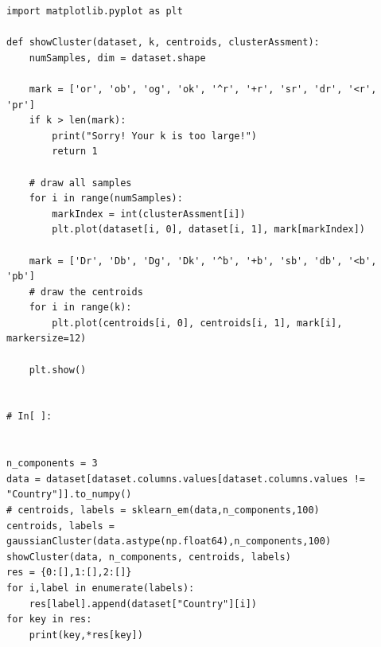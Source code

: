 ﻿\documentclass[a4paper, 11pt]{article}
\numberwithin{equation}{subsection}
\begin{document}
\begin{lstlisting}
import matplotlib.pyplot as plt

def showCluster(dataset, k, centroids, clusterAssment):
    numSamples, dim = dataset.shape

    mark = ['or', 'ob', 'og', 'ok', '^r', '+r', 'sr', 'dr', '<r', 'pr']
    if k > len(mark):
        print("Sorry! Your k is too large!")
        return 1

    # draw all samples
    for i in range(numSamples):
        markIndex = int(clusterAssment[i])
        plt.plot(dataset[i, 0], dataset[i, 1], mark[markIndex])

    mark = ['Dr', 'Db', 'Dg', 'Dk', '^b', '+b', 'sb', 'db', '<b', 'pb']
    # draw the centroids
    for i in range(k):
        plt.plot(centroids[i, 0], centroids[i, 1], mark[i], markersize=12)

    plt.show()


# In[ ]:


n_components = 3
data = dataset[dataset.columns.values[dataset.columns.values != "Country"]].to_numpy()
# centroids, labels = sklearn_em(data,n_components,100)
centroids, labels = gaussianCluster(data.astype(np.float64),n_components,100)
showCluster(data, n_components, centroids, labels)
res = {0:[],1:[],2:[]}
for i,label in enumerate(labels):
    res[label].append(dataset["Country"][i])
for key in res:
    print(key,*res[key])
\end{lstlisting}
\end{document}
